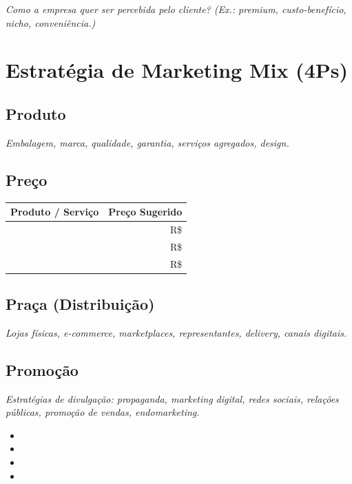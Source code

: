 \documentclass[
	12pt,
	openright,
	oneside,
	a4paper,
	chapter=TITLE,
	section=TITLE,
	english,
	brazil
	]{abntex2}
\newcommand{\icampo}{%
	\hrulefill
}
\newcommand{\tcampo}[1]{%
	{#1}%
}
\newcommand{\instrucao}[1]{%
	\vspace{0.3cm}%
	\noindent%
	{%
		\setlength{\fboxsep}{6pt}%
		\colorbox{azul-claro}{%
			\begin{minipage}{\dimexpr\textwidth-2\fboxsep\relax}%
				\setlength{\parindent}{1.25cm}%
				{\color{cinza-instrucao}\small\itshape #1}%
			\end{minipage}%
		}%
	}%
	\vspace{0.3cm}%
}
\begin{document}
\instrucao{Como a empresa quer ser percebida pelo cliente? (Ex.: premium, custo-benefício, nicho, conveniência.)}

\section{Estratégia de Marketing Mix (4Ps)}

\subsection{Produto}

\instrucao{Embalagem, marca, qualidade, garantia, serviços agregados, design.}

\subsection{Preço}

\centering
\begin{tabularx}{\textwidth}{X r}
\toprule
\rowcolor{azul-claro}
\textbf{Produto / Serviço} & \textbf{Preço Sugerido} \\
\midrule
\tcampo{} & R\$ \tcampo{} \\
\tcampo{} & R\$ \tcampo{} \\
\tcampo{} & R\$ \tcampo{} \\
\bottomrule
\end{tabularx}
\label{tab:tabela-precos}

\subsection{Praça (Distribuição)}

\instrucao{Lojas físicas, e-commerce, marketplaces, representantes, delivery, canais digitais.}

\subsection{Promoção}

\instrucao{Estratégias de divulgação: propaganda, marketing digital, redes sociais, relações públicas, promoção de vendas, endomarketing.}

\begin{itemize}[itemsep=0.2cm]
	\item \icampo
	\item \icampo
	\item \icampo
	\item \icampo
\end{itemize}
\end{document}
